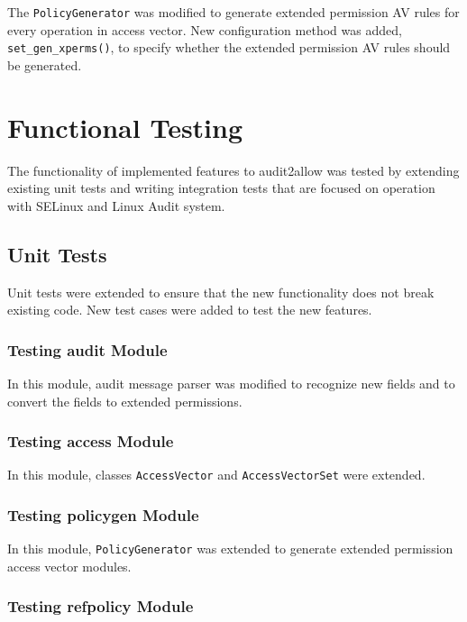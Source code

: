 The \texttt{PolicyGenerator} was modified to generate extended permission AV
rules for every operation in access vector. New configuration method was added,
\texttt{set\_gen\_xperms()}, to specify whether the extended permission AV rules
should be generated.

\chapter{Functional Testing}
The functionality of implemented features to audit2allow was tested by extending
existing unit tests and writing integration tests that are focused on operation
with SELinux and Linux Audit system.

\section{Unit Tests}

Unit tests were extended to ensure that the new functionality does not break
existing code. New test cases were added to test the new features.

\subsection{Testing audit Module}

In this module, audit message parser was modified to recognize new fields and to
convert the fields to extended permissions.

\subsection{Testing access Module}

In this module, classes \texttt{AccessVector} and \texttt{AccessVectorSet} were
extended.

\subsection{Testing policygen Module}

In this module, \texttt{PolicyGenerator} was extended to generate extended
permission access vector modules.

\subsection{Testing refpolicy Module}


